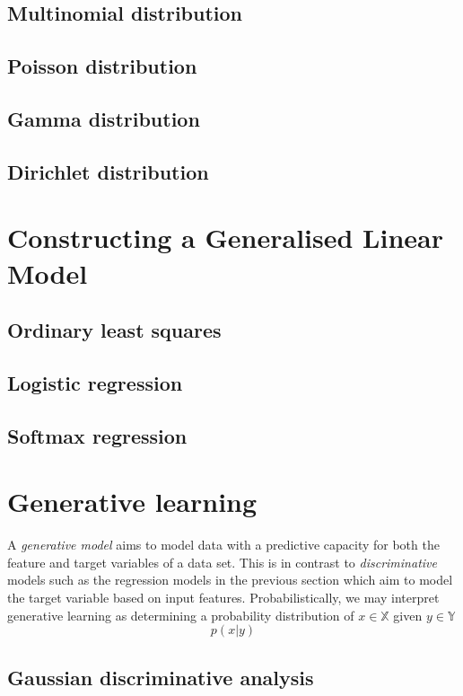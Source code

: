 \documentclass{article}
\theoremstyle{definition}
\theoremstyle{remark}
\begin{document}
\subsection{Multinomial distribution}
\subsection{Poisson distribution}
\subsection{Gamma distribution}
\subsection{Dirichlet distribution}

\section{Constructing a Generalised Linear Model}
\subsection{Ordinary least squares}
\subsection{Logistic regression}
\subsection{Softmax regression}

\section{Generative learning}
A \textit{generative model} aims to model data with a predictive capacity for both the feature and target variables of a data set. This is in contrast to \textit{discriminative} models such as the regression models in the previous section which aim to model the target variable based on input features.
Probabilistically, we may interpret generative learning as determining a probability distribution of $x\in \mathbb{X}$ given $y\in\mathbb{Y}$
\begin{equation}
  p(x|y)
  \label{eqn:generativelearning}
\end{equation}

\subsection{Gaussian discriminative analysis}
\end{document}
